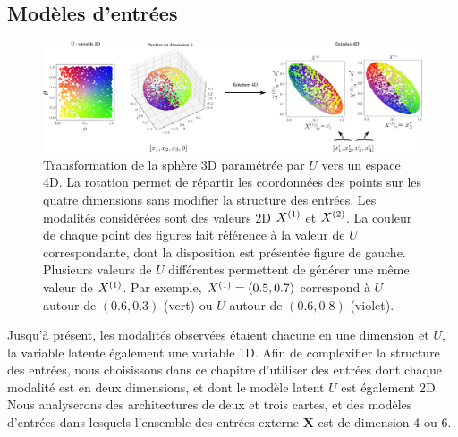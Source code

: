 \documentclass[../main]{subfiles}
\begin{document}
\subsection{Modèles d'entrées}

\begin{figure}
	\includegraphics[width=\textwidth]{sphere_inputs_colormap.png}
	\caption{Transformation de la sphère 3D paramétrée par $U$ vers un espace 4D. La rotation permet de répartir les coordonnées des points sur les quatre dimensions sans modifier la structure des entrées. Les modalités considérées sont des valeurs 2D $X^{({1})}$ et $X^{({2})}$.
	La couleur de chaque point des figures fait référence à la valeur de $U$ correspondante, dont la disposition est présentée figure de gauche. Plusieurs valeurs de $U$ différentes permettent de générer une même valeur de $X^{({1})}$. Par exemple, $X^{({1})} = (0.5, 0.7)$ correspond à $U$ autour de $(0.6,0.3)$ (vert) ou $U$ autour de $ (0.6,0.8)$ (violet).
	\label{fig:sphere_inputs}}
\end{figure}

Jusqu'à présent, les modalités observées étaient chacune en une dimension et $U$, la variable latente également une variable 1D. Afin de complexifier la structure des entrées, nous choisissons dans ce chapitre d'utiliser des entrées dont chaque modalité est en deux dimensions, et dont le modèle latent $U$ est également 2D.
Nous analyserons des architectures de deux et trois cartes, et des modèles d'entrées dans lesquels l'ensemble des entrées externe $\mathbf{X}$ est de dimension 4 ou 6.
\end{document}
